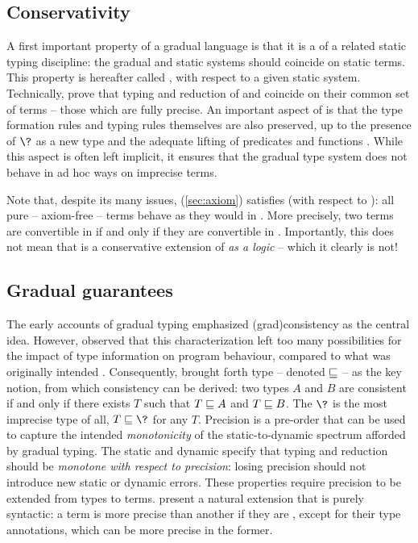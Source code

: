 \subsection{Conservativity} A first important property of a gradual language is that it is a
 of a related static typing discipline:
the gradual and static systems should coincide on static terms.
This property is hereafter called ,
with respect to a given static system.
Technically,  prove that typing and reduction of  and
 coincide on their common set of terms – \ie those which are fully precise.
An important aspect of  is that the type formation rules and typing
rules themselves are also preserved, up to the presence of $\?$ as a new type and the
adequate lifting of predicates and functions .
While this aspect is often left implicit, it ensures that the gradual type system does not
behave in ad hoc ways on imprecise terms.

Note that, despite its many issues,  (\cref{sec:axiom}) satisfies
 (with respect to ):
all pure – \ie axiom-free –  terms behave as they would in .
More precisely, two  terms are convertible in 
if and only if they are convertible in .
Importantly, this does not mean that  is a conservative extension of
 \emph{as a logic} – which it clearly is not!

\subsection{Gradual guarantees}
The early accounts of gradual typing emphasized \kl(grad){consistency} as the central idea.
However,  observed that this characterization left too many
possibilities for the impact of type information on program behaviour,
compared to what was originally intended .
%
Consequently, \textcite{Siek2015} brought forth type  – denoted $\sqsubseteq$ –
as the key notion, from which consistency can be derived: two types $A$ and $B$
are consistent if and only if there exists $T$ such that $T \sqsubseteq A$ and $T \sqsubseteq B$.
The  $\?$ is the most imprecise type of all,
\ie $T \pre \?$ for any $T$.
%
Precision is a pre-order that can be used to capture the intended \emph{monotonicity} of
the static-to-dynamic spectrum afforded by gradual typing.
The static and dynamic  specify that typing
and reduction should be \emph{monotone with respect to precision}:
losing precision should not introduce new static or dynamic errors.
%
These properties require precision to be extended from types to terms.
\textcite{Siek2015} present a natural extension that is purely syntactic:
a term is more precise than another if they are , except
for their type annotations, which can be more precise in the former.

